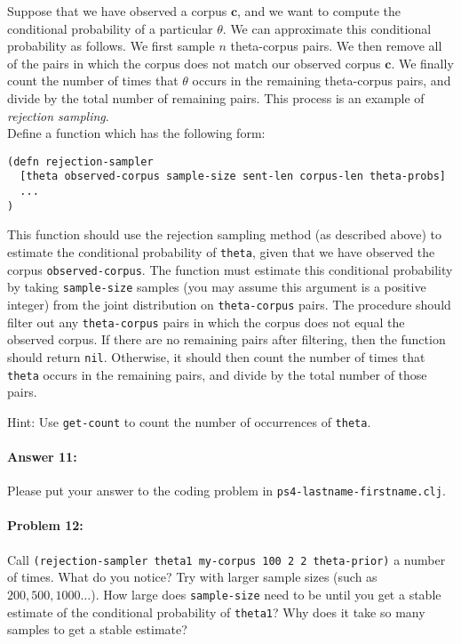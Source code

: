 \documentclass[10pt]{article}
\newcommand{\required}[1]{{\color{blue}{#1}}}
\newcommand{\PSnum}{4}
\begin{document}
 Suppose that we have observed a corpus $\mathbf{c}$, and we
want to compute the conditional probability of a particular $\theta$.
We can approximate this conditional probability as follows. We first
sample $n$ theta-corpus pairs. We then remove all of the pairs in
which the corpus does not match our observed corpus $\mathbf{c}$. We
finally count the number of times that $\theta$ occurs in the
remaining theta-corpus pairs, and divide by the total number of
remaining pairs. This process is an example of \textit{rejection sampling}.
\\

 Define a function \required{\texttt{rejection-sampler}}
which has the following form:
 
\begin{lstlisting}
(defn rejection-sampler
  [theta observed-corpus sample-size sent-len corpus-len theta-probs]
  ...
)
\end{lstlisting}

 This function should use the rejection sampling method (as
described above) to estimate the conditional probability of
\texttt{theta}, given that we have observed the corpus
\texttt{observed-corpus}. The function must estimate this conditional
probability by taking \texttt{sample-size} samples (you may assume
this argument is a positive integer) from the joint distribution on
\texttt{theta-corpus} pairs. The procedure should filter out any
\texttt{theta-corpus} pairs in which the corpus does not equal the
observed corpus. If there are no remaining pairs after filtering, then 
the function should return \texttt{nil}. Otherwise,
it should then count the number of times that \texttt{theta} occurs in the remaining pairs,
and divide by the total number of those pairs.

Hint: Use \texttt{get-count} to count the number of occurrences
of \texttt{theta}.

\paragraph{Answer 11:} Please put your answer to the coding problem in
\texttt{ps\PSnum-lastname-firstname.clj}.

\hrulefill %

\paragraph{Problem 12:}

Call \texttt{(rejection-sampler theta1 my-corpus 100 2 2 theta-prior)}
a number of times. What do you notice? Try with larger sample sizes
(such as $200, 500, 1000\ldots$). How large does
\texttt{sample-size} need to be until you get a stable estimate of the
conditional probability of \texttt{theta1}? Why does it take so many
samples to get a stable estimate?
\end{document}
